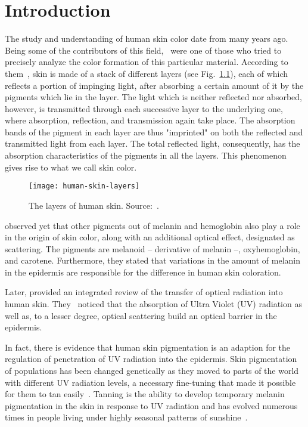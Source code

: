 \chapter{Introduction}
\label{cap:introducao}
The study and understanding of human skin color date from many years ago. Being some of the contributors of this field,~\citet{edwards:39} were one of those who tried to precisely analyze the color formation of this particular material. According to them~\citep{edwards:39}, skin is made of a stack of different layers (see Fig.~\ref{fig:human-skin-layers}), each of which reflects a portion of impinging light, after absorbing a certain amount of it by the pigments which lie in the layer. The light which is neither reflected nor absorbed, however, is transmitted through each successive layer to the underlying one, where absorption, reflection, and transmission again take place. The absorption bands of the pigment in each layer are thus "imprinted" on both the reflected and transmitted light from each layer. The total reflected light, consequently, has the absorption characteristics of the pigments in all the layers. This phenomenon gives rise to what we call skin color.


\begin{figure}[!hb]
  \centering
  \texttt{[image: human-skin-layers]}
  \caption[The layers of human skin]{The layers of human skin. Source:~\citet{nanette:18}.}
  \label{fig:human-skin-layers}
\end{figure}

\citet{edwards:39} observed yet that other pigments out of melanin and hemoglobin also play a role in the origin of skin color, along with an additional optical effect, designated as scattering. The pigments are melanoid -- derivative of melanin --, oxyhemoglobin, and carotene. Furthermore, they stated that variations in the amount of melanin in the epidermis are responsible for the difference in human skin coloration.

Later, \citet{anderson:81} provided an integrated review of the transfer of optical radiation into human skin. They~\citep{anderson:81} noticed that the absorption of Ultra Violet (UV) radiation as well as, to a lesser degree, optical scattering build an optical barrier in the epidermis.

In fact, there is evidence that human skin pigmentation is an adaption for the regulation of penetration of UV radiation into the epidermis. Skin pigmentation of populations has been changed genetically as they moved to parts of the world with different UV radiation levels, a necessary fine-tuning that made it possible for them to tan easily~\citep{jablonski:00}. Tanning is the ability to develop temporary melanin pigmentation in the skin in response to UV radiation and has evolved numerous times in people living under highly seasonal patterns of sunshine~\citep{jablonski:10}.

